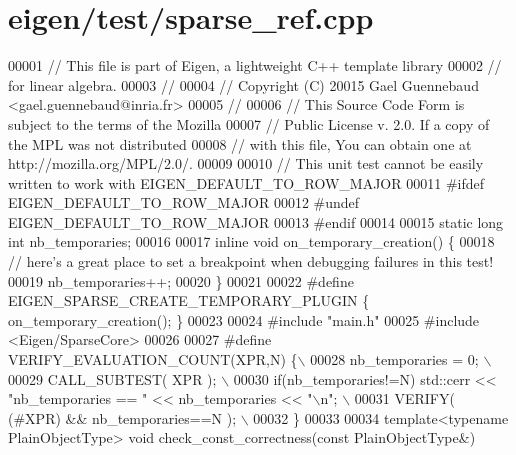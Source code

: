 \hypertarget{eigen_2test_2sparse__ref_8cpp_source}{}\section{eigen/test/sparse\+\_\+ref.cpp}
\label{eigen_2test_2sparse__ref_8cpp_source}

\begin{DoxyCode}
00001 \textcolor{comment}{// This file is part of Eigen, a lightweight C++ template library}
00002 \textcolor{comment}{// for linear algebra.}
00003 \textcolor{comment}{//}
00004 \textcolor{comment}{// Copyright (C) 20015 Gael Guennebaud <gael.guennebaud@inria.fr>}
00005 \textcolor{comment}{//}
00006 \textcolor{comment}{// This Source Code Form is subject to the terms of the Mozilla}
00007 \textcolor{comment}{// Public License v. 2.0. If a copy of the MPL was not distributed}
00008 \textcolor{comment}{// with this file, You can obtain one at http://mozilla.org/MPL/2.0/.}
00009 
00010 \textcolor{comment}{// This unit test cannot be easily written to work with EIGEN\_DEFAULT\_TO\_ROW\_MAJOR}
00011 \textcolor{preprocessor}{#ifdef EIGEN\_DEFAULT\_TO\_ROW\_MAJOR}
00012 \textcolor{preprocessor}{#undef EIGEN\_DEFAULT\_TO\_ROW\_MAJOR}
00013 \textcolor{preprocessor}{#endif}
00014 
00015 \textcolor{keyword}{static} \textcolor{keywordtype}{long} \textcolor{keywordtype}{int} nb\_temporaries;
00016 
00017 \textcolor{keyword}{inline} \textcolor{keywordtype}{void} on\_temporary\_creation() \{
00018   \textcolor{comment}{// here's a great place to set a breakpoint when debugging failures in this test!}
00019   nb\_temporaries++;
00020 \}
00021 
00022 \textcolor{preprocessor}{#define EIGEN\_SPARSE\_CREATE\_TEMPORARY\_PLUGIN \{ on\_temporary\_creation(); \}}
00023 
00024 \textcolor{preprocessor}{#include "main.h"}
00025 \textcolor{preprocessor}{#include <Eigen/SparseCore>}
00026 
00027 \textcolor{preprocessor}{#define VERIFY\_EVALUATION\_COUNT(XPR,N) \{\(\backslash\)}
00028 \textcolor{preprocessor}{    nb\_temporaries = 0; \(\backslash\)}
00029 \textcolor{preprocessor}{    CALL\_SUBTEST( XPR ); \(\backslash\)}
00030 \textcolor{preprocessor}{    if(nb\_temporaries!=N) std::cerr << "nb\_temporaries == " << nb\_temporaries << "\(\backslash\)n"; \(\backslash\)}
00031 \textcolor{preprocessor}{    VERIFY( (#XPR) && nb\_temporaries==N ); \(\backslash\)}
00032 \textcolor{preprocessor}{  \}}
00033 
00034 \textcolor{keyword}{template}<\textcolor{keyword}{typename} PlainObjectType> \textcolor{keywordtype}{void} check\_const\_correctness(\textcolor{keyword}{const} PlainObjectType&)

\end{DoxyCode}

